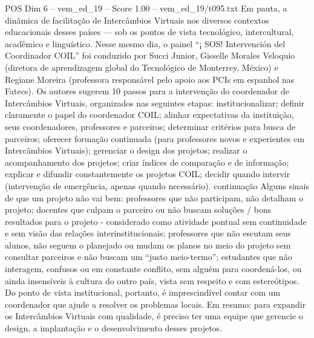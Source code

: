 \begin{textsample}{POS Dim 6 – vem\_ed\_19 – Score 1.00 – vem\_ed\_19/t095.txt}
Em pauta, a dinâmica de facilitação de Intercâmbios Virtuais nos diversos contextos educacionais desses países — sob os pontos de vista tecnológico, intercultural, acadêmico e linguístico.
Nesse mesmo dia, o painel “¡ SOS!
Intervención del Coordinador COIL” foi conduzido por Succi Junior, Gisselle Morales Veloquio (diretora de aprendizagem global do Tecnológico de Monterrey, México) e Regiane Moreira (professora responsável pelo apoio aos PCIs em espanhol nas Fatecs).
Os autores sugerem 10 passos para a intervenção do coordenador de Intercâmbios Virtuais, organizados nas seguintes etapas: institucionalizar; definir claramente o papel do coordenador COIL; alinhar expectativas da instituição, seus coordenadores, professores e parceiros; determinar critérios para busca de parceiros; oferecer formação continuada (para professores novos e experientes em Intercâmbios Virtuais); gerenciar o design dos projetos; realizar o acompanhamento dos projetos; criar índices de comparação e de informação; explicar e difundir constantemente os projetos COIL; decidir quando intervir (intervenção de emergência, apenas quando necessário). continuação Alguns sinais de que um projeto não vai bem: professores que não participam, não detalham o projeto; docentes que culpam o parceiro ou não buscam soluções / bons resultados para o projeto - considerado como atividade pontual sem continuidade e sem visão das relações interinstitucionais; professores que não escutam seus alunos, não seguem o planejado ou mudam os planos no meio do projeto sem consultar parceiros e não buscam um “justo meio-termo”; estudantes que não interagem, confusos ou em constante conflito, sem alguém para coordená-los, ou ainda insensíveis à cultura do outro país, vista sem respeito e com estereótipos.
Do ponto de vista institucional, portanto, é imprescindível contar com um coordenador que ajude a resolver os problemas locais.
Em resumo: para expandir os Intercâmbios Virtuais com qualidade, é preciso ter uma equipe que gerencie o design, a implantação e o desenvolvimento desses projetos.

\end{textsample}
